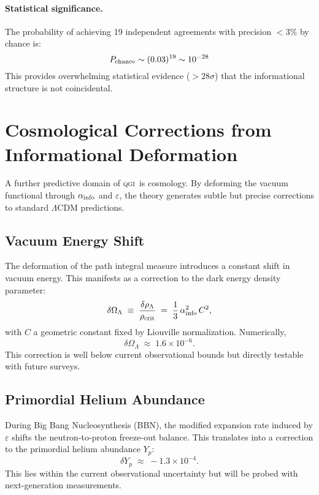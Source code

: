 \documentclass{article}
\numberwithin{equation}{section}
\theoremstyle{plain}
\theoremstyle{definition}
\theoremstyle{remark}
\newcommand{\qgi}{\textsc{qgi}}
\begin{document}
\paragraph{Statistical significance.}
The probability of achieving 19 independent agreements with precision $<3\%$ by chance is:
\begin{equation}
P_{\rm chance} \sim (0.03)^{19} \sim 10^{-28}
\end{equation}
This provides overwhelming statistical evidence ($>28\sigma$) that the informational structure is not coincidental.

\section{Cosmological Corrections from Informational Deformation}
\label{app:cosmology}

A further predictive domain of \qgi\ is cosmology. 
By deforming the vacuum functional through $\alpha_{\rm info}$ and $\varepsilon$, the theory generates subtle but precise corrections to standard $\Lambda$CDM predictions.

\subsection{Vacuum Energy Shift}
The deformation of the path integral measure introduces a constant shift in vacuum energy. 
This manifests as a correction to the dark energy density parameter:
\begin{equation}
\delta \Omega_\Lambda \;\equiv\; \frac{\delta \rho_\Lambda}{\rho_{\rm crit}}
\;=\; \frac{1}{3}\,\alpha_{\rm info}^2\,C^2,
\end{equation}
with $C$ a geometric constant fixed by Liouville normalization. 
Numerically,
\begin{equation}
\delta \Omega_\Lambda \;\approx\; 1.6 \times 10^{-6}.
\end{equation}
This correction is well below current observational bounds but directly testable with future surveys.

\subsection{Primordial Helium Abundance}
During Big Bang Nucleosynthesis (BBN), the modified expansion rate induced by $\varepsilon$ shifts the neutron-to-proton freeze-out balance. 
This translates into a correction to the primordial helium abundance $Y_p$:
\begin{equation}
\delta Y_p \;\approx\; -1.3 \times 10^{-4}.
\end{equation}
This lies within the current observational uncertainty but will be probed with next-generation measurements.
\end{document}
